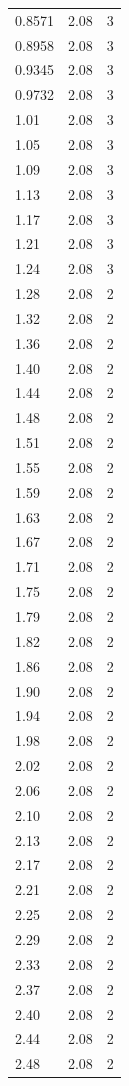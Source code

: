\begin{longtable}{lrr}
  0.8571 & 2.08 & 3 \\
  0.8958 & 2.08 & 3 \\
  0.9345 & 2.08 & 3 \\
  0.9732 & 2.08 & 3 \\
  1.01 & 2.08 & 3 \\
  1.05 & 2.08 & 3 \\
  1.09 & 2.08 & 3 \\
  1.13 & 2.08 & 3 \\
  1.17 & 2.08 & 3 \\
  1.21 & 2.08 & 3 \\
  1.24 & 2.08 & 3 \\
  1.28 & 2.08 & 2 \\
  1.32 & 2.08 & 2 \\
  1.36 & 2.08 & 2 \\
  1.40 & 2.08 & 2 \\
  1.44 & 2.08 & 2 \\
  1.48 & 2.08 & 2 \\
  1.51 & 2.08 & 2 \\
  1.55 & 2.08 & 2 \\
  1.59 & 2.08 & 2 \\
  1.63 & 2.08 & 2 \\
  1.67 & 2.08 & 2 \\
  1.71 & 2.08 & 2 \\
  1.75 & 2.08 & 2 \\
  1.79 & 2.08 & 2 \\
  1.82 & 2.08 & 2 \\
  1.86 & 2.08 & 2 \\
  1.90 & 2.08 & 2 \\
  1.94 & 2.08 & 2 \\
  1.98 & 2.08 & 2 \\
  2.02 & 2.08 & 2 \\
  2.06 & 2.08 & 2 \\
  2.10 & 2.08 & 2 \\
  2.13 & 2.08 & 2 \\
  2.17 & 2.08 & 2 \\
  2.21 & 2.08 & 2 \\
  2.25 & 2.08 & 2 \\
  2.29 & 2.08 & 2 \\
  2.33 & 2.08 & 2 \\
  2.37 & 2.08 & 2 \\
  2.40 & 2.08 & 2 \\
  2.44 & 2.08 & 2 \\
  2.48 & 2.08 & 2 \\

\end{longtable}
